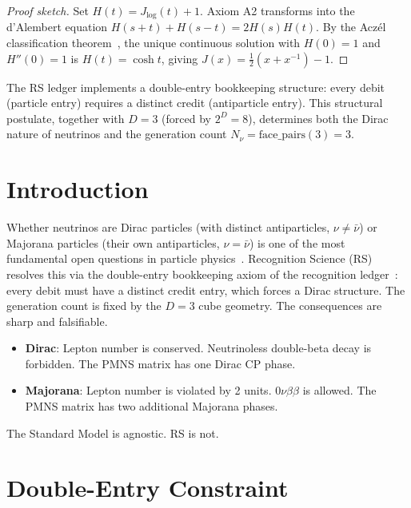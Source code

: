 \documentclass[12pt,a4paper]{article}
\theoremstyle{definition}
\theoremstyle{remark}
\begin{document}
\begin{proof}[Proof sketch]
Set $H(t) = J_{\log}(t)+1$.  Axiom A2 transforms into the d'Alembert
equation $H(s+t)+H(s-t)=2H(s)H(t)$.  By the Acz\'el classification
theorem~\cite{Aczel1966}, the unique continuous solution with $H(0)=1$
and $H''(0)=1$ is $H(t)=\cosh t$, giving
$J(x)=\tfrac{1}{2}(x+x^{-1})-1$.
\end{proof}

\noindent The RS ledger implements a double-entry bookkeeping structure:
every debit (particle entry) requires a distinct credit (antiparticle
entry).  This structural postulate, together with $D=3$ (forced by
$2^D=8$), determines both the Dirac nature of neutrinos and the
generation count $N_\nu = \mathrm{face\_pairs}(3) = 3$.

\section{Introduction}
\label{sec:intro}

Whether neutrinos are Dirac particles (with distinct
antiparticles, $\nu \neq \bar{\nu}$) or Majorana particles
(their own antiparticles, $\nu = \bar{\nu}$) is one of the most
fundamental open questions in particle
physics~\cite{Bilenky1987}.  Recognition Science (RS) resolves
this via the double-entry bookkeeping axiom of the recognition
ledger~\cite{RS_Axioms}: every debit must have a distinct
credit entry, which forces a Dirac structure.  The generation
count is fixed by the $D = 3$ cube geometry.  The consequences
are sharp and falsifiable.
\begin{itemize}
  \item \textbf{Dirac}: Lepton number is conserved.
  Neutrinoless double-beta decay is forbidden.  The PMNS matrix
  has one Dirac CP phase.
  \item \textbf{Majorana}: Lepton number is violated by 2 units.
  $0\nu\beta\beta$ is allowed.  The PMNS matrix has two additional
  Majorana phases.
\end{itemize}

The Standard Model is agnostic.  RS is not.

\section{Double-Entry Constraint}
\label{sec:double-entry}
\end{document}
